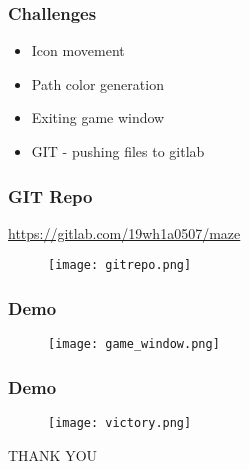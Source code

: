 \documentclass[14pt]{beamer}
\begin{document}
    \begin{frame}
	\frametitle{Challenges}
        \begin{itemize}
	    \item Icon movement 
	    \item Path color generation 
	    \item Exiting game window 
	    \item GIT - pushing files to gitlab
        \end{itemize}
    \end{frame}
    \begin{frame}
	\frametitle{GIT Repo}
	    \url{https://gitlab.com/19wh1a0507/maze}
	\begin{figure}[htp]
                        \centering
                         \texttt{[image: gitrepo.png]}
                 \end{figure}
    \end{frame}
    \begin{frame}
	\frametitle{Demo}
	     \begin{figure}[htp]
                        \centering
                         \texttt{[image: game\_window.png]}
                 \end{figure}	
    \end{frame}
    \begin{frame}
	\frametitle{Demo}
	     \begin{figure}[htp]
                        \centering
                         \texttt{[image: victory.png]}
                 \end{figure}	
    \end{frame}
    \begin{frame}
	\begin{center}
	     THANK YOU
	\end{center}
    \end{frame}
\end{document}
